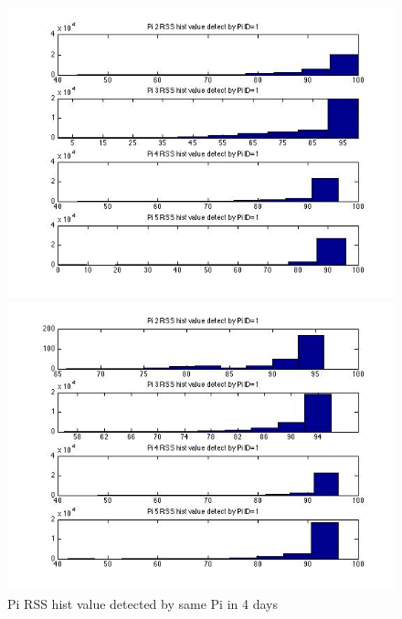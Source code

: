 \documentclass[10pt,conference]{IEEEtran}
\begin{document}
\begin{figure}[htbp]
\begin{minipage}[t]{0.2\textwidth}
	\includegraphics[scale=0.2]{time0-3}
\end{minipage}
\begin{minipage}[t]{0.2\textwidth}
	\centering
	\includegraphics[scale=0.2]{time0-4}
\end{minipage}
\caption{Pi RSS hist value detected by same Pi in 4 days}\label{hist}
\end{figure}

\end{document}

